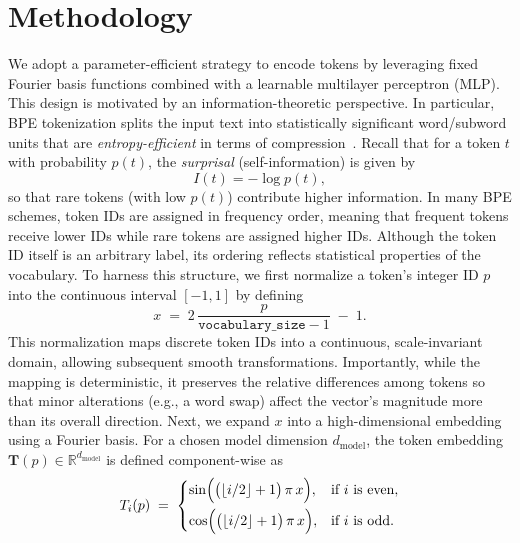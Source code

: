 \documentclass{article}
\begin{document}
\section{Methodology}
We adopt a parameter-efficient strategy to encode tokens by leveraging fixed Fourier basis functions combined with a learnable multilayer perceptron (MLP). This design is motivated by an information-theoretic perspective. In particular, BPE tokenization splits the input text into statistically significant word/subword units that are \emph{entropy-efficient} in terms of compression~\cite{sennrich2016neural}. Recall that for a token \(t\) with probability \(p(t)\), the \emph{surprisal} (self-information) is given by
\[
I(t) = -\log p(t),
\]
so that rare tokens (with low \(p(t)\)) contribute higher information. In many BPE schemes, token IDs are assigned in frequency order, meaning that frequent tokens receive lower IDs while rare tokens are assigned higher IDs. Although the token ID itself is an arbitrary label, its ordering reflects statistical properties of the vocabulary.
To harness this structure, we first normalize a token's integer ID \(p\) into the continuous interval \([-1,1]\) by defining
\[
x \;=\; 2\,\frac{p}{\texttt{vocabulary\_size}-1} \;-\; 1.
\]
This normalization maps discrete token IDs into a continuous, scale-invariant domain, allowing subsequent smooth transformations. Importantly, while the mapping is deterministic, it preserves the relative differences among tokens so that minor alterations (e.g., a word swap) affect the vector's magnitude more than its overall direction.
Next, we expand \(x\) into a high-dimensional embedding using a Fourier basis. For a chosen model dimension \(d_{\mathrm{model}}\), the token embedding \(\mathbf{T}(p) \in \mathbb{R}^{d_{\mathrm{model}}}\) is defined component-wise as
\[
T_{i}(p) 
\;=\;
\begin{cases}
\sin\Bigl(\bigl(\lfloor i/2 \rfloor + 1\bigr)\,\pi\,x\Bigr), & \text{if } i \text{ is even},\\[6pt]
\cos\Bigl(\bigl(\lfloor i/2 \rfloor + 1\bigr)\,\pi\,x\Bigr), & \text{if } i \text{ is odd}.
\end{cases}
\]
\end{document}
